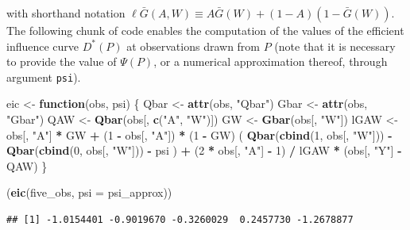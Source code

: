 \documentclass[]{article}
\newenvironment{Shaded}{\begin{snugshade}}{\end{snugshade}}
\newcommand{\ControlFlowTok}[1]{\textcolor[rgb]{0.13,0.29,0.53}{\textbf{#1}}}
\newcommand{\DataTypeTok}[1]{\textcolor[rgb]{0.13,0.29,0.53}{#1}}
\newcommand{\DecValTok}[1]{\textcolor[rgb]{0.00,0.00,0.81}{#1}}
\newcommand{\KeywordTok}[1]{\textcolor[rgb]{0.13,0.29,0.53}{\textbf{#1}}}
\newcommand{\NormalTok}[1]{#1}
\newcommand{\OperatorTok}[1]{\textcolor[rgb]{0.81,0.36,0.00}{\textbf{#1}}}
\newcommand{\StringTok}[1]{\textcolor[rgb]{0.31,0.60,0.02}{#1}}
\newcommand{\Gbar}{\bar{G}}
\theoremstyle{definition}
\theoremstyle{definition}
\theoremstyle{definition}
\theoremstyle{remark}
\begin{document}
with shorthand notation
\(\ell\Gbar(A,W) \equiv A\Gbar(W) + (1-A) (1-\Gbar(W))\). The following
chunk of code enables the computation of the values of the efficient
influence curve \(D^{*}(P)\) at observations drawn from \(P\) (note that
it is necessary to provide the value of \(\Psi(P)\), or a numerical
approximation thereof, through argument \texttt{psi}).

\begin{Shaded}
\begin{Highlighting}[]
\NormalTok{eic <-}\StringTok{ }\ControlFlowTok{function}\NormalTok{(obs, psi) \{}
\NormalTok{  Qbar <-}\StringTok{ }\KeywordTok{attr}\NormalTok{(obs, }\StringTok{"Qbar"}\NormalTok{)}
\NormalTok{  Gbar <-}\StringTok{ }\KeywordTok{attr}\NormalTok{(obs, }\StringTok{"Gbar"}\NormalTok{)}
\NormalTok{  QAW <-}\StringTok{ }\KeywordTok{Qbar}\NormalTok{(obs[, }\KeywordTok{c}\NormalTok{(}\StringTok{"A"}\NormalTok{, }\StringTok{"W"}\NormalTok{)])}
\NormalTok{  GW <-}\StringTok{ }\KeywordTok{Gbar}\NormalTok{(obs[, }\StringTok{"W"}\NormalTok{])}
\NormalTok{  lGAW <-}\StringTok{ }\NormalTok{obs[, }\StringTok{"A"}\NormalTok{] }\OperatorTok{*}\StringTok{ }\NormalTok{GW }\OperatorTok{+}\StringTok{ }\NormalTok{(}\DecValTok{1} \OperatorTok{-}\StringTok{ }\NormalTok{obs[, }\StringTok{"A"}\NormalTok{]) }\OperatorTok{*}\StringTok{ }\NormalTok{(}\DecValTok{1} \OperatorTok{-}\StringTok{ }\NormalTok{GW)}
\NormalTok{  ( }\KeywordTok{Qbar}\NormalTok{(}\KeywordTok{cbind}\NormalTok{(}\DecValTok{1}\NormalTok{, obs[, }\StringTok{"W"}\NormalTok{])) }\OperatorTok{-}\StringTok{ }\KeywordTok{Qbar}\NormalTok{(}\KeywordTok{cbind}\NormalTok{(}\DecValTok{0}\NormalTok{, obs[, }\StringTok{"W"}\NormalTok{])) }\OperatorTok{-}\StringTok{ }\NormalTok{psi ) }\OperatorTok{+}
\StringTok{    }\NormalTok{(}\DecValTok{2} \OperatorTok{*}\StringTok{ }\NormalTok{obs[, }\StringTok{"A"}\NormalTok{] }\OperatorTok{-}\StringTok{ }\DecValTok{1}\NormalTok{) }\OperatorTok{/}\StringTok{ }\NormalTok{lGAW }\OperatorTok{*}\StringTok{ }\NormalTok{(obs[, }\StringTok{"Y"}\NormalTok{] }\OperatorTok{-}\StringTok{ }\NormalTok{QAW)}
\NormalTok{\}}

\NormalTok{(}\KeywordTok{eic}\NormalTok{(five_obs, }\DataTypeTok{psi =}\NormalTok{ psi_approx))}
\end{Highlighting}
\end{Shaded}

\begin{verbatim}
## [1] -1.0154401 -0.9019670 -0.3260029  0.2457730 -1.2678877
\end{verbatim}
\end{document}
